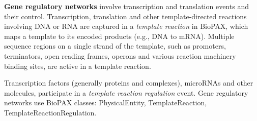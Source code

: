 \begin{frame}
\begin{block}{\textbf{Gene regulatory networks}}
involve transcription and translation
events and their control. Transcription, translation and other template-directed reactions involving DNA or RNA are captured in a {\it template reaction} in BioPAX, which maps a template to its encoded products (e.g., DNA to mRNA). Multiple sequence regions on a single strand of the template, such as promoters, terminators, open reading frames, operons and various reaction machinery binding sites, are active in a template reaction. 
\end{block}
\begin{block}{}
Transcription factors (generally proteins and complexes), microRNAs and other molecules, participate in a {\it template reaction regulation} event. Gene regulatory networks use BioPAX classes: PhysicalEntity, TemplateReaction, TemplateReactionRegulation. 
\end{block}
\end{frame}
